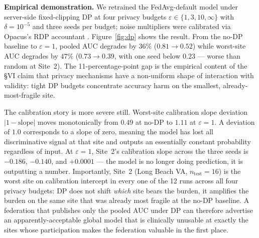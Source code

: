 \textbf{Empirical demonstration.} We retrained the FedAvg-default model under server-side fixed-clipping DP \cite{bonawitz2017practical, dwork2006differential} at four privacy budgets $\varepsilon \in \{1, 3, 10, \infty\}$ with $\delta=10^{-5}$ and three seeds per budget; noise multipliers were calibrated via Opacus's RDP accountant \cite{opacus2021}. Figure~\ref{fig:dp} shows the result. From the no-DP baseline to $\varepsilon=1$, pooled AUC degrades by $36\%$ ($0.81 \to 0.52$) while worst-site AUC degrades by $47\%$ ($0.73 \to 0.39$, with one seed below $0.23$ --- worse than random at Site~2). The 11-percentage-point gap is the empirical content of the \S VI claim that privacy mechanisms have a non-uniform shape of interaction with validity: tight DP budgets concentrate accuracy harm on the smallest, already-most-fragile site.

The calibration story is more severe still. Worst-site calibration slope deviation $|1 - \text{slope}|$ moves monotonically from $0.49$ at no-DP to $1.11$ at $\varepsilon=1$. A deviation of $1.0$ corresponds to a slope of zero, meaning the model has lost all discriminative signal at that site and outputs an essentially constant probability regardless of input. At $\varepsilon=1$, Site~2's calibration slope across the three seeds is $-0.186$, $-0.140$, and $+0.0001$ --- the model is no longer doing prediction, it is outputting a number. Importantly, Site~2 (Long Beach VA, $n_{\text{test}}{=}16$) is the worst site on calibration intercept in every one of the 12 runs across all four privacy budgets: DP does not shift \emph{which} site bears the burden, it amplifies the burden on the same site that was already most fragile at the no-DP baseline. A federation that publishes only the pooled AUC under DP can therefore advertise an apparently-acceptable global model that is clinically unusable at exactly the sites whose participation makes the federation valuable in the first place.

